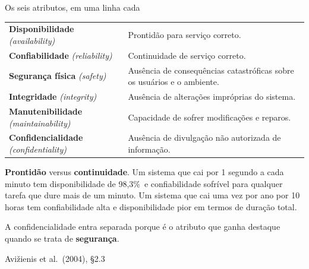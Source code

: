 \documentclass{beamer}
\newcommand{\en}[1]{{\color{depCinza}\textit{#1}}}
\newcommand{\sect}[1]{\par\smallskip\hfill{\tiny\color{black!55}Avi\v{z}ienis et al.\ (2004), #1}}
\begin{document}
\begin{frame}{Os seis atributos, em uma linha cada}
    \scriptsize
    \begin{tabularx}{\linewidth}{@{}p{3.3cm} >{\raggedright\arraybackslash}X@{}}
        \toprule
        \textbf{Disponibilidade} \en{(availability)} & Prontid\~ao para servi\c{c}o correto. \\
        \textbf{Confiabilidade} \en{(reliability)} & Continuidade de servi\c{c}o correto. \\
        \textbf{Seguran\c{c}a f\'isica} \en{(safety)} & Aus\^encia de consequ\^encias catastr\'oficas sobre os usu\'arios e o ambiente. \\
        \textbf{Integridade} \en{(integrity)} & Aus\^encia de altera\c{c}\~oes impr\'oprias do sistema. \\
        \textbf{Manutenibilidade} \en{(maintainability)} & Capacidade de sofrer modifica\c{c}\~oes e reparos. \\
        \midrule
        \textbf{Confidencialidade} \en{(confidentiality)} & Aus\^encia de divulga\c{c}\~ao n\~ao autorizada de informa\c{c}\~ao. \\
        \bottomrule
    \end{tabularx}
    \medskip
    \begin{armadilha}
        \scriptsize
        \textbf{Prontid\~ao} versus \textbf{continuidade}. Um sistema que cai por 1 segundo a cada minuto tem disponibilidade de 98,3\%\ e confiabilidade sofr\'ivel para qualquer tarefa que dure mais de um minuto. Um sistema que cai uma vez por ano por 10 horas tem confiabilidade alta e disponibilidade pior em termos de dura\c{c}\~ao total.
    \end{armadilha}
    \medskip
    {\scriptsize A confidencialidade entra separada porque \'e o atributo que ganha destaque quando se trata de \textbf{seguran\c{c}a}.}
    \sect{\S2.3}
\end{frame}
\end{document}

